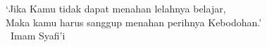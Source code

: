\begin{dedication}

`Jika Kamu tidak dapat menahan lelahnya belajar, \\
Maka kamu harus sanggup menahan perihnya Kebodohan.'\\ 
~Imam Syafi'i~\\

\end{dedication}